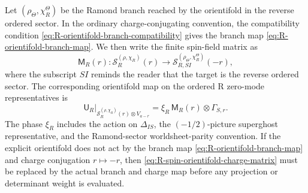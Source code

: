 \documentclass[11pt]{article}
\begin{document}
Let \((\rho_\Theta,\chi_R^\Theta)\) be the Ramond branch reached by the orientifold in the
reverse ordered sector. In the ordinary charge-conjugating convention, the compatibility condition
\eqref{eq:R-orientifold-branch-compatibility} gives the branch map
\eqref{eq:R-orientifold-branch-map}. We then write the finite spin-field matrix as
\begin{equation}
  \mathsf M_R(r):
  \mathcal S_R^{(\rho,\chi_R)}(r)
  \longrightarrow
  \mathcal S_{R,SI}^{(\rho_\Theta,\chi_R^\Theta)}(-r),
  \label{eq:R-spin-orientifold-charge-matrix}
\end{equation}
where the subscript \(SI\) reminds the reader that the target is the reverse ordered sector. The
corresponding orientifold map on the ordered R zero-mode representatives is
\begin{equation}
  \mathsf U_R\big|_{\mathcal S_R^{(\rho,\chi_R)}(r)\otimes V_{a-r}}
  =
  \xi_R\,
  \mathsf M_R(r)\otimes\Gamma_{S,r}.
  \label{eq:R-zero-mode-orientifold-matrix}
\end{equation}
The phase \(\xi_R\) includes the action on \(\Delta_{IS}\), the \((-1/2)\)-picture superghost
representative, and the Ramond-sector worldsheet-parity convention. If the explicit orientifold
does not act by the branch map \eqref{eq:R-orientifold-branch-map} and charge conjugation
\(r\mapsto-r\), then \eqref{eq:R-spin-orientifold-charge-matrix} must be replaced by the actual
branch and charge map before any projection or determinant weight is evaluated.
\end{document}
